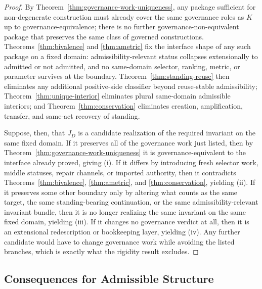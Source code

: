 \documentclass[11pt]{article}
\theoremstyle{definition}
\theoremstyle{remark}
\begin{document}
\begin{proof}
By Theorem~\ref{thm:governance-work-uniqueness}, any package sufficient for non-degenerate construction must already cover the same governance roles as $K$ up to governance-equivalence; there is no further governance-non-equivalent package that preserves the same class of governed constructions. Theorems~\ref{thm:bivalence} and \ref{thm:ametric} fix the interface shape of any such package on a fixed domain: admissibility-relevant status collapses extensionally to admitted or not admitted, and no same-domain selector, ranking, metric, or parameter survives at the boundary. Theorem~\ref{thm:standing-reuse} then eliminates any additional positive-side classifier beyond reuse-stable admissibility; Theorem~\ref{thm:unique-interior} eliminates plural same-domain admissible interiors; and Theorem~\ref{thm:conservation} eliminates creation, amplification, transfer, and same-act recovery of standing.

Suppose, then, that $J_D$ is a candidate realization of the required invariant on the same fixed domain. If it preserves all of the governance work just listed, then by Theorem~\ref{thm:governance-work-uniqueness} it is governance-equivalent to the interface already proved, giving (i). If it differs by introducing fresh selector work, middle statuses, repair channels, or imported authority, then it contradicts Theorems~\ref{thm:bivalence}, \ref{thm:ametric}, and \ref{thm:conservation}, yielding (ii). If it preserves some other boundary only by altering what counts as the same target, the same standing-bearing continuation, or the same admissibility-relevant invariant bundle, then it is no longer realizing the same invariant on the same fixed domain, yielding (iii). If it changes no governance verdict at all, then it is an extensional redescription or bookkeeping layer, yielding (iv). Any further candidate would have to change governance work while avoiding the listed branches, which is exactly what the rigidity result excludes.
\end{proof}

\subsection{Consequences for Admissible Structure}
\end{document}
